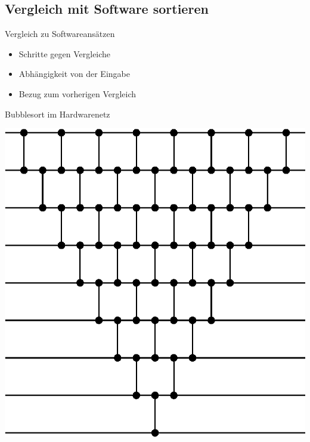 \documentclass[ucs,9pt]{beamer}
\begin{document}
\subsection{Vergleich mit Software sortieren}
\begin{frame}{Vergleich zu Softwareansätzen}
	\begin{itemize}
		\item Schritte gegen Vergleiche
	 	\item Abhängigkeit von der Eingabe
	 	\item Bezug zum vorherigen Vergleich
	\end{itemize}
\end{frame}

\begin{frame}{Bubblesort im Hardwarenetz}
	\begin{center}
	    \includegraphics[scale=0.65]{bubblesort.eps}
	\end{center}
\end{frame}
\end{document}
